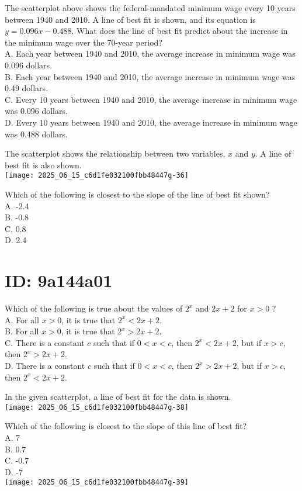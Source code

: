 The scatterplot above shows the federal-mandated minimum wage every 10 years between 1940 and 2010. A line of best fit is shown, and its equation is $y=0.096 x-0.488$. What does the line of best fit predict about the increase in the minimum wage over the 70-year period?\\
A. Each year between 1940 and 2010, the average increase in minimum wage was 0.096 dollars.\\
B. Each year between 1940 and 2010, the average increase in minimum wage was 0.49 dollars.\\
C. Every 10 years between 1940 and 2010, the average increase in minimum wage was 0.096 dollars.\\
D. Every 10 years between 1940 and 2010, the average increase in minimum wage was 0.488 dollars.

The scatterplot shows the relationship between two variables, $x$ and $y$. A line of best fit is also shown.\\
\texttt{[image: 2025\_06\_15\_c6d1fe032100fbb48447g-36]}

Which of the following is closest to the slope of the line of best fit shown?\\
A. -2.4\\
B. -0.8\\
C. 0.8\\
D. 2.4

\section*{ID: 9a144a01}
Which of the following is true about the values of $2^{x}$ and $2 x+2$ for $x>0$ ?\\
A. For all $x>0$, it is true that $2^{x}<2 x+2$.\\
B. For all $x>0$, it is true that $2^{x}>2 x+2$.\\
C. There is a constant $c$ such that if $0<x<c$, then $2^{x}<2 x+2$, but if $x>c$, then $2^{x}>2 x+2$.\\
D. There is a constant $c$ such that if $0<x<c$, then $2^{x}>2 x+2$, but if $x>c$, then $2^{x}<2 x+2$.

In the given scatterplot, a line of best fit for the data is shown.\\
\texttt{[image: 2025\_06\_15\_c6d1fe032100fbb48447g-38]}

Which of the following is closest to the slope of this line of best fit?\\
A. 7\\
B. 0.7\\
C. -0.7\\
D. -7\\
\texttt{[image: 2025\_06\_15\_c6d1fe032100fbb48447g-39]}

